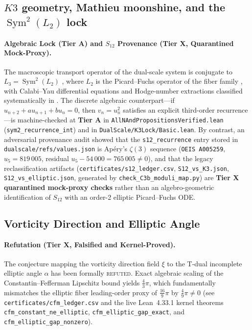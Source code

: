 \documentclass[11pt,a4paper]{article}
\theoremstyle{plain}
\theoremstyle{definition}
\theoremstyle{remark}
\newcommand{\tierA}{\textbf{Tier A}}
\newcommand{\tierX}{\textbf{Tier X}}
\begin{document}
\subsection{$K3$ geometry, Mathieu moonshine, and the $\operatorname{Sym}^{2}(L_{2})$ lock}
\paragraph{Algebraic Lock (\tierA{}) and $S_{12}$ Provenance (\tierX{}, Quarantined Mock-Proxy).}
The macroscopic transport operator of the dual-scale system is conjugate to
$L_{3}=\operatorname{Sym}^{2}(L_{2})$ \cite{Deligne1974}, where $L_{2}$ is the Picard--Fuchs
operator of the fiber family \cite{Doran2000, EOT2011, Gannon2016, GPPV2020}, with Calabi--Yau differential equations and Hodge-number extractions classified systematically in \cite{AlmkvistZudilin2005, DoranHarderThompson2016}. The discrete algebraic counterpart---if $u_{n+2} + a u_{n+1} + b u_n = 0$, then $v_n = u_n^2$ satisfies an explicit third-order recurrence---is machine-checked at \tierA{} in \texttt{AllNAndPropositionsVerified.lean} (\texttt{sym2\_recurrence\_int}) and in \texttt{DualScale/K3Lock/Basic.lean}. By contrast, an adversarial provenance audit showed that the \texttt{s12\_recurrence} entry stored in \texttt{dualscale/refs/values.json} is Ap\'{e}ry's $\zeta(3)$ sequence (\texttt{OEIS A005259}, $u_5 = 819\,005$, residual $u_5 - 54\,000 = 765\,005 \neq 0$), and that the legacy reclassification artifacts (\texttt{certificates/s12\_ledger.csv}, \texttt{S12\_vs\_K3.json}, \texttt{S12\_vs\_elliptic.json}, generated by \texttt{check\_C3b\_moduli\_map.py}) are \textbf{\tierX{} quarantined mock-proxy checks} rather than an algebro-geometric identification of $S_{12}$ with an order-2 elliptic Picard--Fuchs ODE.

\subsection{Vorticity Direction and Elliptic Angle}
\paragraph{Refutation (\tierX{}, Falsified and Kernel-Proved).}
The conjecture mapping the vorticity direction field $\xi$ to the T-dual incomplete elliptic angle $\alpha$ has been formally \textsc{refuted}. Exact algebraic scaling of the Constantin--Fefferman Lipschitz bound yields $\frac{4}{3}\pi$, which fundamentally mismatches the elliptic fiber leading-order proxy of $\frac{16}{9}\pi$ by $\frac{4}{9}\pi \neq 0$ (see \texttt{certificates/cfm\_ledger.csv} and the live Lean~4.33.1 kernel theorems \texttt{cfm\_constant\_ne\_elliptic}, \texttt{cfm\_elliptic\_gap\_exact}, and \texttt{cfm\_elliptic\_gap\_nonzero}).
\end{document}
